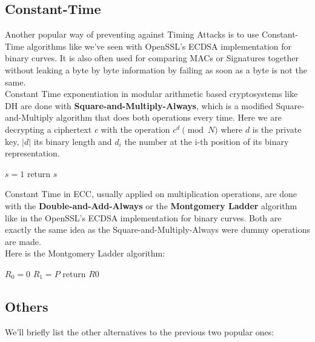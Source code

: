 \documentclass[a4paper,11pt]{article}
\begin{document}
\subsection{Constant-Time}

Another popular way of preventing against Timing Attacks is to use Constant-Time algorithms like we've seen with OpenSSL's ECDSA implementation for binary curves. It is also often used for comparing MACs or Signatures together without leaking a byte by byte information by failing as soon as a byte is not the same.\\

Constant Time exponentiation in modular arithmetic based cryptosystems like DH are done with \textbf{Square-and-Multiply-Always}, which is a modified Square-and-Multiply algorithm that does both operations every time. Here we are decrypting a ciphertext $c$ with the operation $c^d \pmod{N}$ where $d$ is the private key, $|d|$ its binary length and $d_i$ the number at the i-th position of its binary representation.

\DontPrintSemicolon
\begin{algorithm}[H]
    $s = 1$\;
    return $s$\;
\end{algorithm}

Constant Time in ECC, usually applied on multiplication operations, are done with the \textbf{Double-and-Add-Always} or the \textbf{Montgomery Ladder} algorithm like in the OpenSSL's ECDSA implementation for binary curves. Both are exactly the same idea as the Square-and-Multiply-Always were dummy operations are made.\\
Here is the Montgomery Ladder algorithm:

\begin{algorithm}[H]
    $R_0 = 0$\;
    $R_1 = P$\;
    return $R0$\;
\end{algorithm}

\subsection{Others}

We'll briefly list the other alternatives to the previous two popular ones:\\
\end{document}
